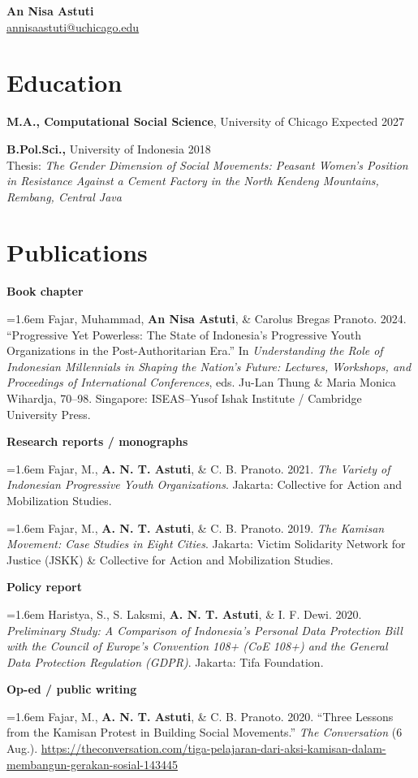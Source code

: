 \documentclass[11pt]{article}
\newcommand{\pub}[1]{\par\hangindent=1.6em\hangafter=1 #1\par}
\begin{document}
{\LARGE \textbf{An Nisa Astuti}}\\
\href{mailto:annisaastuti@uchicago.edu}{annisaastuti@uchicago.edu}

\section*{Education}
\textbf{M.A., Computational Social Science}, University of Chicago \hfill Expected 2027

\textbf{B.Pol.Sci.,} University of Indonesia \hfill 2018\\
Thesis: \emph{The Gender Dimension of Social Movements: Peasant Women’s Position in Resistance Against a Cement Factory in the North Kendeng Mountains, Rembang, Central Java}

\section*{Publications}

\textbf{Book chapter}
\pub{Fajar, Muhammad, \textbf{An Nisa Astuti}, \& Carolus Bregas Pranoto. 2024. ``Progressive Yet Powerless: The State of Indonesia’s Progressive Youth Organizations in the Post-Authoritarian Era.'' In \emph{Understanding the Role of Indonesian Millennials in Shaping the Nation’s Future: Lectures, Workshops, and Proceedings of International Conferences}, eds. Ju-Lan Thung \& Maria Monica Wihardja, 70--98. Singapore: ISEAS--Yusof Ishak Institute / Cambridge University Press.}

\textbf{Research reports / monographs}
\pub{Fajar, M., \textbf{A. N. T. Astuti}, \& C. B. Pranoto. 2021. \emph{The Variety of Indonesian Progressive Youth Organizations}. Jakarta: Collective for Action and Mobilization Studies.}
\pub{Fajar, M., \textbf{A. N. T. Astuti}, \& C. B. Pranoto. 2019. \emph{The Kamisan Movement: Case Studies in Eight Cities}. Jakarta: Victim Solidarity Network for Justice (JSKK) \& Collective for Action and Mobilization Studies.}

\textbf{Policy report}
\pub{Haristya, S., S. Laksmi, \textbf{A. N. T. Astuti}, \& I. F. Dewi. 2020. \emph{Preliminary Study: A Comparison of Indonesia’s Personal Data Protection Bill with the Council of Europe’s Convention 108+ (CoE 108+) and the General Data Protection Regulation (GDPR)}. Jakarta: Tifa Foundation.}

\textbf{Op-ed / public writing}
\pub{Fajar, M., \textbf{A. N. T. Astuti}, \& C. B. Pranoto. 2020. ``Three Lessons from the Kamisan Protest in Building Social Movements.'' \emph{The Conversation} (6 Aug.). \url{https://theconversation.com/tiga-pelajaran-dari-aksi-kamisan-dalam-membangun-gerakan-sosial-143445}}
\end{document}
